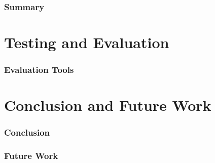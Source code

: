 \documentclass[USenglish]{article}
\begin{document}
\section{Summary}

\part{Testing and Evaluation}
\section{Evaluation Tools}

\part{Conclusion and Future Work}
\section{Conclusion}

\section{Future Work}



\printglossary
\end{document}
